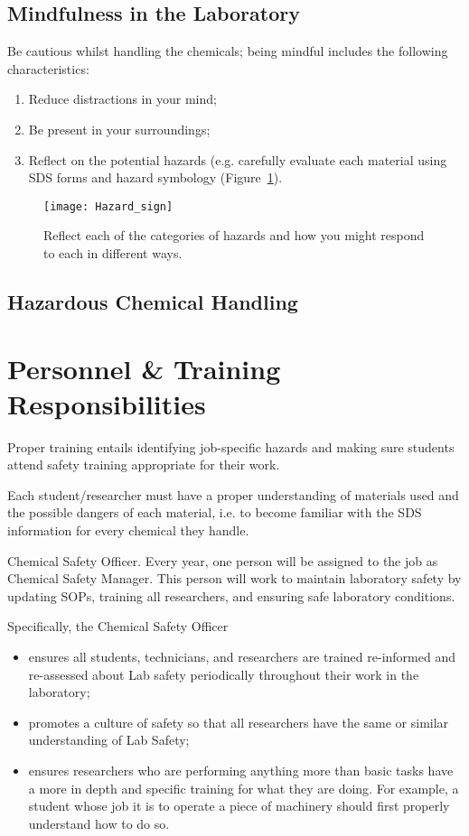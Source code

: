 \documentclass[12pt]{../SOP4_alpha}\usepackage[]{graphicx}\usepackage[]{color}
\begin{document}
\subsection{Mindfulness in the Laboratory}

Be cautious whilst handling the chemicals; being mindful includes the following characteristics: 

\begin{enumerate}
  \item Reduce distractions in your mind;
  \item Be present in your surroundings;
  \item Reflect on the potential hazards (e.g. carefully evaluate each material using SDS forms and hazard symbology (Figure~\ref{fig:hazard_sign}).
\end{enumerate}

\begin{figure}
  \texttt{[image: Hazard\_sign]}
  \label{fig:hazard_sign}
  \caption{Reflect each of the categories of hazards and how you might respond to each in different ways.}
\end{figure}

\subsection{Hazardous Chemical Handling}

\section{Personnel \& Training Responsibilities}

\NP Proper training entails identifying job-specific hazards and making sure students attend safety training appropriate for their work. 

\NP Each student/researcher must have a proper understanding of materials used and the possible dangers of each material, i.e. to become familiar with the SDS information for every chemical they handle.

\NP Chemical Safety Officer. Every year, one person will be assigned to the job as Chemical Safety Manager. This person will work to maintain laboratory safety by updating SOPs, training all researchers, and ensuring safe laboratory conditions.

\NP Specifically, the Chemical Safety Officer 

\begin{itemize}
  \item ensures all students, technicians, and researchers are trained re-informed and re-assessed about Lab safety periodically throughout their work in the laboratory;
  \item promotes a culture of safety so that all researchers have the same or similar understanding of Lab Safety;
  \item ensures researchers who are performing anything more than basic tasks have a more in depth and specific training for what they are doing. For example, a student whose job it is to operate a piece of machinery should first properly understand how to do so.

\end{itemize}
\end{document}

